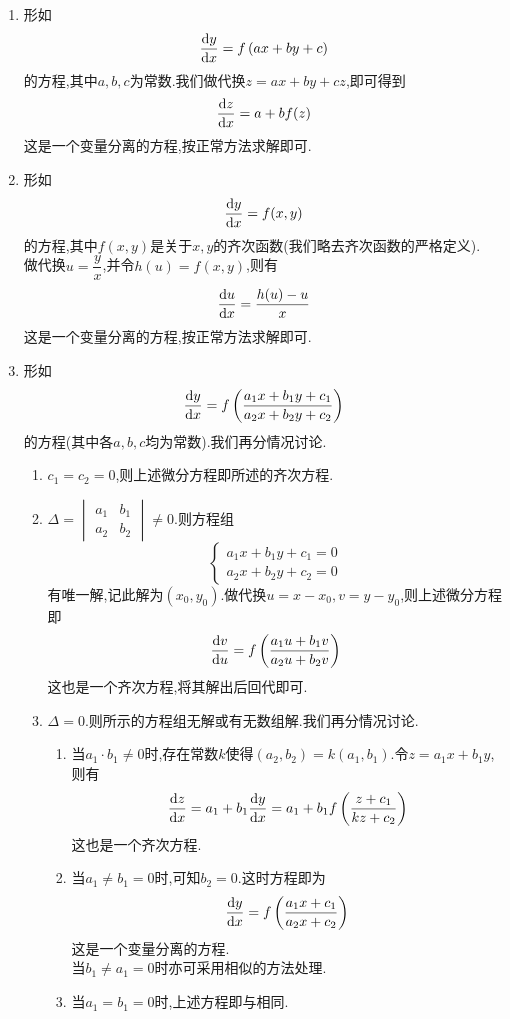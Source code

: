 \documentclass{ctexart}
\begin{document}
\begin{enumerate}[label=\tbf{\arabic*.}]
    \item 形如
        \[\dfrac{\mathrm{d} y}{\mathrm{d} x}=f\left(ax+by+c\right)\]
        的方程,其中$a,b,c$为常数.我们做代换$z=ax+by+cz$,即可得到
        \[\dfrac{\mathrm{d} z}{\mathrm{d} x}=a+bf(z)\]
        这是一个变量分离的方程,按正常方法求解即可.
    \item 形如
        \[\dfrac{\mathrm{d} y}{\mathrm{d} x}=f(x,y)\]
        的方程,其中$f(x,y)$是关于$x,y$的齐次函数(我们略去齐次函数的严格定义).\\
        做代换$u=\dfrac yx$,并令$h(u)=f(x,y)$,则有
        \[\dfrac{\mathrm{d} u}{\mathrm{d} x}=\dfrac{h(u)-u}{x}\]
        这是一个变量分离的方程,按正常方法求解即可.
    \item 形如
        \[\dfrac{\mathrm{d} y}{\mathrm{d} x}=f\left(\dfrac{a_1x+b_1y+c_1}{a_2x+b_2y+c_2}\right)\]
        的方程(其中各$a,b,c$均为常数).我们再分情况讨论.
        \begin{enumerate}[label=\tbf{\alph*.}]
            \item $c_1=c_2=0$,则上述微分方程即所述的齐次方程.
            \item $\Delta=\begin{vmatrix}
                    a_1&b_1\\a_2&b_2
                \end{vmatrix}\neq0$.则方程组
                \[\left\{\begin{array}{l}
                    a_1x+b_1y+c_1=0\\a_2x+b_2y+c_2=0
                \end{array}\right.\]
                \newpage 有唯一解,记此解为$\left(x_0,y_0\right)$.做代换$u=x-x_0,v=y-y_0$,则上述微分方程即
                \[\dfrac{\mathrm{d} v}{\mathrm{d} u}=f\left(\dfrac{a_1u+b_1v}{a_2u+b_2v}\right)\]
                这也是一个齐次方程,将其解出后回代即可.
            \item $\Delta=0$.则所示的方程组无解或有无数组解.我们再分情况讨论.
                \begin{enumerate}[label=\tbf{\roman*.}]
                    \item 当$a_1\cdot b_1\neq0$时,存在常数$k$使得$\left(a_2,b_2\right)=k\left(a_1,b_1\right)$.令$z=a_1x+b_1y$,则有
                        \[\dfrac{\mathrm{d} z}{\mathrm{d} x}=a_1+b_1\dfrac{\mathrm{d} y}{\mathrm{d} x}=a_1+b_1f\left(\dfrac{z+c_1}{kz+c_2}\right)\]
                        这也是一个齐次方程.
                    \item 当$a_1\neq b_1=0$时,可知$b_2=0$.这时方程即为
                        \[\dfrac{\mathrm{d} y}{\mathrm{d} x}=f\left(\dfrac{a_1x+c_1}{a_2x+c_2}\right)\]
                        这是一个变量分离的方程.\\
                        当$b_1\neq a_1=0$时亦可采用相似的方法处理.
                    \item 当$a_1=b_1=0$时,上述方程即与相同.
                \end{enumerate}
        \end{enumerate}
\end{enumerate}
\end{document}
